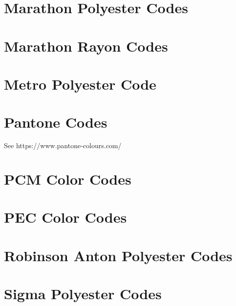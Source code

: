 \documentclass[a4paper]{report}
\begin{document}
{{{{{%

\section{Marathon Polyester Codes}

%

\section{Marathon Rayon Codes}

%

\section{Metro Polyester Code}

%

\section{Pantone Codes}

See https://www.pantone-colours.com/}

%

\section{PCM Color Codes}

%

\section{PEC Color Codes}

%

\section{Robinson Anton Polyester Codes}

%

\section{Sigma Polyester Codes}

%

}}}}
\end{document}
